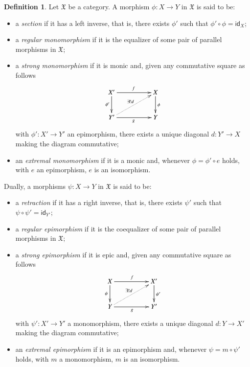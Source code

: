 \documentclass[12pt]{article}
\theoremstyle{definition}
\newtheorem{definition}[lemma]{Definition}
\def\X{\mathfrak X}
\numberwithin{equation}{section}
\newcommand{\id}[1]{\mathsf{id}_{#1}}
\begin{document}
\begin{definition}
Let $\X$ be a category. A morphism $\phi\colon X\to Y$ in $\X$ is said to be:
\begin{itemize}
\item a {\em section} if it has a left inverse, that is, there exists $\phi'$ such that $\phi'\circ \phi=\id X$;
\item a {\em regular monomorphism} if it is the equalizer of some pair of parallel morphisms in $\X$;
\item a {\em strong monomorphism} if it is monic %
and, given any commutative square as follows
\begin{equation}\label{diagonal}
\xymatrix@C=50pt{
X'\ar[d]_-{\phi'}\ar[r]^f&X\ar[d]^{\phi}\\
Y'\ar@{.>}[ur]^{\exists!d}\ar[r]_g&Y}
\end{equation}
with $\phi'\colon X'\to Y'$ an epimorphism, there exists a unique diagonal $d\colon Y'\to X$ making the diagram commutative;
\item an {\em extremal monomorphism} if it is a monic %
and, whenever ${\phi = \phi' \circ  e}$ holds, with $e$ an epimorphism, $e$ is an isomorphism. 
\end{itemize} 
Dually, a morphisms $\psi\colon X\to Y$ in $\X$ is said to be:
\begin{itemize}
\item a {\em retraction} if it has a right inverse, that is, there exists $\psi'$ such that $\psi\circ \psi'=\id {Y'}$;
\item a {\em regular epimorphism} if it is the coequalizer of some pair of parallel morphisms in $\X$;
\item a {\em strong epimorphism} if it is epic and, given any commutative square as follows
\[
\xymatrix@C=50pt{
X\ar[d]_-{\psi}\ar[r]^f&X'\ar[d]^{\psi'}\\
Y\ar@{.>}[ur]^{\exists!d}\ar[r]_g&Y'}
\]
with $\psi'\colon X'\to Y'$ a monomorphism, there exists a unique diagonal $d\colon Y\to X'$ making the diagram commutative;
\item an {\em extremal epimorphism} if it is an epimorphism and, whenever ${\psi = m\circ \psi'}$ holds, with $m$ a monomorphism,  $m$ is an isomorphism.
\end{itemize} 
\end{definition}
\end{document}
